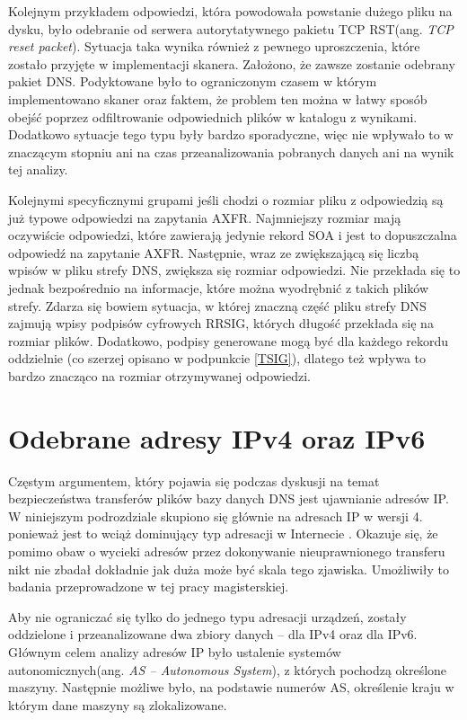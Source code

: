 Kolejnym przykładem odpowiedzi, która powodowała powstanie dużego pliku na dysku, było odebranie od serwera autorytatywnego pakietu
TCP RST(ang. \textit{TCP reset packet}). Sytuacja taka wynika również z pewnego uproszczenia, które zostało przyjęte w implementacji
skanera. Założono, że zawsze zostanie odebrany pakiet DNS. Podyktowane było to ograniczonym czasem w którym implementowano skaner
oraz faktem, że problem ten można w łatwy sposób obejść poprzez odfiltrowanie odpowiednich plików w katalogu z wynikami. Dodatkowo
sytuacje tego typu były bardzo sporadyczne, więc nie wpływało to w znaczącym stopniu ani na czas przeanalizowania pobranych danych
ani na wynik tej analizy.

Kolejnymi specyficznymi grupami jeśli chodzi o rozmiar pliku z odpowiedzią są już typowe odpowiedzi na zapytania AXFR. Najmniejszy rozmiar mają oczywiście odpowiedzi, które zawierają jedynie rekord SOA i jest to dopuszczalna odpowiedź na zapytanie AXFR. Następnie, wraz ze zwiększającą się liczbą wpisów w pliku strefy DNS, zwiększa się rozmiar odpowiedzi. Nie przekłada się to jednak bezpośrednio na informacje, które można wyodrębnić z takich plików strefy. Zdarza się bowiem sytuacja, w której znaczną część pliku strefy DNS zajmują wpisy podpisów cyfrowych RRSIG, których długość przekłada się na rozmiar plików. Dodatkowo, podpisy generowane mogą być dla każdego rekordu oddzielnie (co szerzej opisano w podpunkcie \ref{TSIG}), dlatego też wpływa to bardzo znacząco na rozmiar otrzymywanej odpowiedzi.

\section{Odebrane adresy IPv4 oraz IPv6}
Częstym argumentem, który pojawia się podczas dyskusji na temat bezpieczeństwa transferów plików bazy danych DNS jest ujawnianie
adresów IP. W niniejszym podrozdziale skupiono się głównie na adresach IP w wersji 4. ponieważ jest to wciąż dominujący typ adresacji
w Internecie \cite{Ipv6_deployment}. Okazuje się, że pomimo obaw o wycieki adresów przez dokonywanie nieuprawnionego transferu nikt nie
zbadał dokładnie jak duża może być skala tego zjawiska. Umożliwiły to badania przeprowadzone w tej pracy magisterskiej.

Aby nie ograniczać się tylko do jednego typu adresacji urządzeń, zostały oddzielone i przeanalizowane dwa zbiory danych -- dla IPv4
oraz dla IPv6. Głównym celem analizy adresów IP było ustalenie systemów autonomicznych(ang. \textit{AS -- Autonomous System}),
z których pochodzą określone maszyny. Następnie możliwe było, na podstawie numerów AS, określenie kraju w którym dane maszyny są
zlokalizowane.

